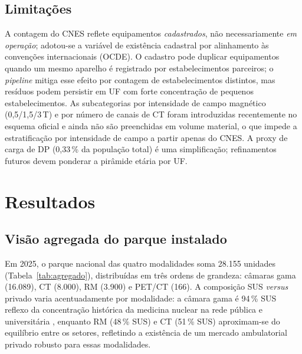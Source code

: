 \documentclass[12pt,a4paper,oneside]{article}
\begin{document}
\subsection{Limitações}

A contagem do CNES reflete equipamentos \textit{cadastrados}, não
necessariamente \textit{em operação}; adotou-se a variável de
existência cadastral por alinhamento às convenções internacionais
(OCDE). O cadastro pode duplicar equipamentos quando um mesmo aparelho
é registrado por estabelecimentos parceiros; o \textit{pipeline}
mitiga esse efeito por contagem de estabelecimentos distintos, mas
resíduos podem persistir em UF com forte concentração de pequenos
estabelecimentos. As subcategorias por intensidade de campo magnético
(0,5/1,5/3\,T) e por número de canais de CT foram introduzidas
recentemente no esquema oficial e ainda não são preenchidas em volume
material, o que impede a estratificação por intensidade de campo a
partir apenas do CNES. A proxy de carga de DP (0,33\,\% da população
total) é uma simplificação; refinamentos futuros devem ponderar a
pirâmide etária por UF.

\section{Resultados}

\subsection{Visão agregada do parque instalado}

Em 2025, o parque nacional das quatro modalidades soma 28.155 unidades
(Tabela~\ref{tab:agregado}), distribuídas em três ordens de grandeza:
câmaras gama (16.089), CT (8.000), RM (3.900) e PET/CT (166). A
composição SUS \textit{versus} privado varia acentuadamente por
modalidade: a câmara gama é 94\,\% SUS \textemdash{} reflexo da
concentração histórica da medicina nuclear na rede pública e
universitária \textemdash{}, enquanto RM (48\,\% SUS) e CT (51\,\%
SUS) aproximam-se do equilíbrio entre os setores, refletindo a
existência de um mercado ambulatorial privado robusto para essas
modalidades.
\end{document}
